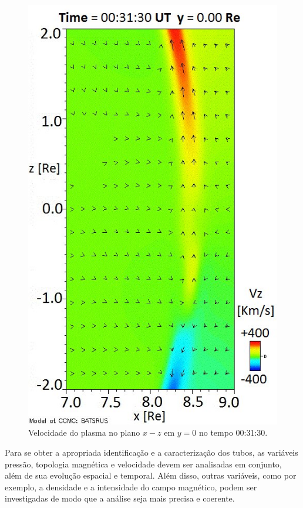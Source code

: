 \begin{figure}
	\begin{center}
		\includegraphics[scale=0.33]{velocidade.jpg}
		\caption{Velocidade do plasma no plano $x-z$ em $y= 0$ no tempo 00:31:30.}
		\label{velocidade}
	\end{center}
\end{figure}

Para se obter a apropriada identificação e a caracterização dos tubos, as variáveis pressão, topologia magnética e velocidade devem ser analisadas em conjunto, além de sua evolução espacial e temporal. Além disso, outras variáveis, como por exemplo, a densidade e a intensidade do campo magnético, podem ser investigadas de modo que a análise seja mais precisa e coerente. 


